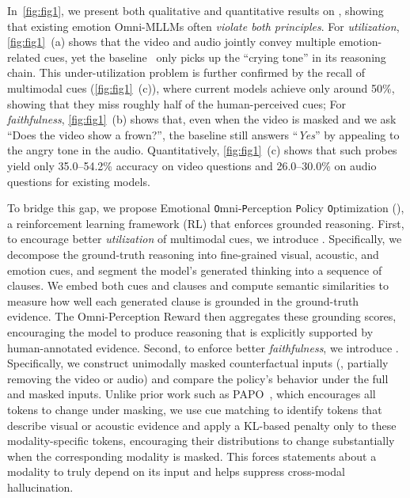 \documentclass{article}
\theoremstyle{plain}
\theoremstyle{definition}
\theoremstyle{remark}
\begin{document}
In~\cref{fig:fig1}, we present both qualitative and quantitative results on \ourbench, showing that existing emotion Omni-MLLMs often \textit{violate both principles}. For \textit{utilization}, \cref{fig:fig1}~(a) shows that the video and audio jointly convey multiple emotion-related cues, yet the baseline~\cite{lian2025affectgptr1} only picks up the ``crying tone'' in its reasoning chain. This {under-utilization} problem is further confirmed by the recall of multimodal cues (\cref{fig:fig1}~(c)), where current models achieve only around 50\%, showing that they miss roughly half of the human-perceived cues; For \textit{faithfulness}, \cref{fig:fig1}~(b) shows that, even when the video is masked and we ask ``Does the video show a frown?'', the baseline still answers ``\emph{Yes}'' by appealing to the angry tone in the audio. Quantitatively, \cref{fig:fig1}~(c) shows that such probes yield only 35.0–54.2\% accuracy on video questions and 26.0–30.0\% on audio questions for existing models.


To bridge this gap, we propose Emotional \texttt{O}mni-\texttt{P}erception \texttt{P}olicy \texttt{O}ptimization (\ourmethod), a reinforcement learning framework (RL) that enforces grounded reasoning. First, to encourage better \textit{utilization} of multimodal cues, we introduce \textbf{\ourreward}. Specifically, we decompose the ground-truth reasoning into fine-grained visual, acoustic, and emotion cues, and segment the model’s generated thinking into a sequence of clauses. We embed both cues and clauses and compute semantic similarities to measure how well each generated clause is grounded in the ground-truth evidence. The Omni-Perception Reward then aggregates these grounding scores, encouraging the model to produce reasoning that is explicitly supported by human-annotated evidence.
Second, to enforce better \textit{faithfulness}, we introduce \textbf{\ourloss}. Specifically, we construct unimodally masked counterfactual inputs (\eg, partially removing the video or audio) and compare the policy’s behavior under the full and masked inputs. Unlike prior work such as PAPO~\cite{wang2025perception}, which encourages all tokens to change under masking, we use cue matching to identify tokens that describe visual or acoustic evidence and apply a KL-based penalty only to these modality-specific tokens, encouraging their distributions to change substantially when the corresponding modality is masked. This forces statements about a modality to truly depend on its input and helps suppress cross-modal hallucination.
\end{document}
